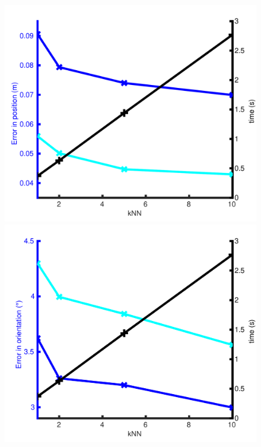 \begin{figure}
    \centering
    	
   	\begin{minipage}{0.65\linewidth}	
    \centering   	
   		
   		\begin{minipage}{0.5\linewidth}
   			\includegraphics[width=\linewidth]{results/pos_err}
   		\end{minipage}\hfill
   		\begin{minipage}{0.5\linewidth}
   			\includegraphics[width=\linewidth]{results/ori_err}
   		\end{minipage}
   		

\end{minipage}
\end{figure}
